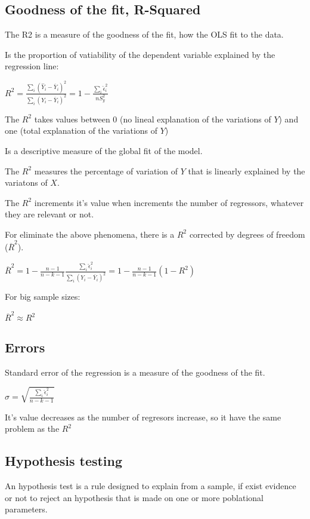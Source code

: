 \documentclass[10pt,landscape]{article}
\begin{document}
\begin{multicols}{3}
\subsection*{Goodness of the fit, R-Squared}

The R2 is a measure of the goodness of the fit, how the OLS fit to the data.

Is the proportion of vatiability of the dependent variable explained by the regression line:

$R^2 = \frac{\sum_i (\hat{Y}_i - \overline{Y}_i)^2}{\sum_i (Y_i - \overline{Y}_i)^2} = 1 - \frac{\sum_i \hat{\epsilon}_i^2}{nS_y^2}$

The $R^2$ takes values between 0 (no lineal explanation of the variations of $Y$) and one (total explanation of the variations of $Y$)

Is a descriptive measure of the global fit of the model.

The $R^2$ measures the percentage of variation of $Y$ that is linearly explained by the variatons of $X$.

The $R^2$ increments it's value when increments the number of regressors, whatever they are relevant or not.

For eliminate the above phenomena, there is a $R^2$ corrected by degrees of freedom ($\overline{R}^2$).

$\overline{R}^2 = 1 - \frac{n-1}{n-k-1} \frac{\sum_i \hat{\epsilon}_i^2}{\sum_i (Y_i - \overline{Y}_i)^2} = 1 - \frac{n-1}{n-k-1} (1-R^2)$

For big sample sizes:

$\overline{R}^2 \approx R^2$

\subsection*{Errors}

Standard error of the regression is a measure of the goodness of the fit.

$\hat{\sigma} = \sqrt{\frac{\sum_i \hat{\epsilon}_i^2}{n-k-1}}$

It's value decreases as the number of regresors increase, so it have the same problem as the $R^2$

\subsection*{Hypothesis testing}

An hypothesis test is a rule designed to explain from a sample, if exist evidence or not to reject an hypothesis that is made on one or more poblational parameters.


\end{multicols}
\end{document}
